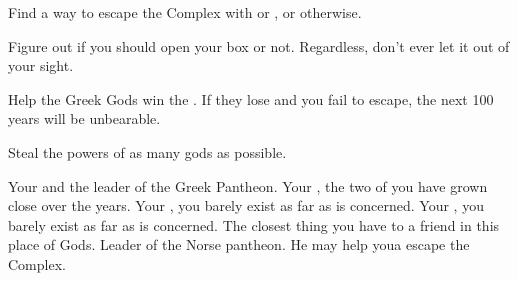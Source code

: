 \documentclass[char]{guardians}
\begin{document}
\begin{itemz}[Goals]
  \item Find a way to escape the Complex with \cUnity{} or \cOdin{}, or otherwise.
  \item Figure out if you should open your box or not. Regardless, don't ever let it out of your sight.
  \item Help the Greek Gods win the \pGames{}. If they lose and you fail to escape, the next 100 years will be unbearable.
  \item Steal the powers of as many gods as possible.
\end{itemz}


\begin{contacts}
  \contact{\cZeus{}} Your \cZeus{\parent} and the leader of the Greek Pantheon.
  \contact{\cHera{}} Your \cHera{\parent}, the two of you have grown close over the years.
  \contact{\cAthena{}} Your \cAthena{\sibling}, you barely exist as far as \cAthena{\they} is concerned.
  \contact{\cHephaestus{}} Your \cHephaestus{\sibling}, you barely exist as far as \cHephaestus{\they} is concerned.
  \contact{\cWarden{}} The closest thing you have to a friend in this place of Gods.
  \contact{\cOdin{}} Leader of the Norse pantheon. He may help youa escape the Complex.
\end{contacts}
\end{document}

